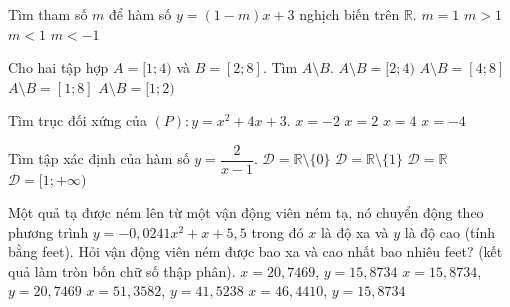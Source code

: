 \begin{ex}%
	Tìm tham số $m$ để hàm số $y=(1-m)x+3$ nghịch biến trên $\mathbb{R}$.
	\choice
	{$m=1$}
	{\True $m>1$}
	{$m<1$}
	{$m<-1$}
\end{ex}

\begin{ex}%
	Cho hai tập hợp $A=[1;4)$ và $B=[2;8]$. Tìm $A\setminus B$.
	\choice
	{$A\setminus B=[2;4)$}
	{$A\setminus B=[4;8]$}
	{$A\setminus B=[1;8]$}
	{\True $A\setminus B=[1;2)$}
	\loigiai{
		$A\setminus B=[1;2)$.
	}
\end{ex}

\begin{ex}%
	Tìm trục đối xứng của $(P)\colon y=x^2+4x+3$.
	\choice
	{\True $x=-2$}
	{$x=2$}
	{$x=4$}
	{$x=-4$}
\end{ex}

\begin{ex}%
	Tìm tập xác định của hàm số $y=\dfrac{2}{x-1}$.
	\choice
	{$\mathscr{D}=\mathbb{R}\setminus\{0\}$}
	{\True $\mathscr{D}=\mathbb{R}\setminus\{1\}$}
	{$\mathscr{D}=\mathbb{R}$}
	{$\mathscr{D}=[1;+\infty)$}
\end{ex}

\begin{ex}%
	Một quả tạ được ném lên từ một vận động viên ném tạ, nó chuyển động theo phương trình $y=-0{,}0241x^2+x+5{,}5$ trong đó $x$ là độ xa và $y$ là độ cao (tính bằng feet). Hỏi vận động viên ném được bao xa và cao nhất bao nhiêu feet? (kết quả làm tròn bốn chữ số thập phân).
	\choice
	{$x=20{,}7469$, $y=15{,}8734$}
	{$x=15{,}8734$, $y=20{,}7469$}
	{$x=51{,}3582$, $y=41{,}5238$}
	{\True $x=46{,}4410$, $y=15{,}8734$}
\end{ex}

